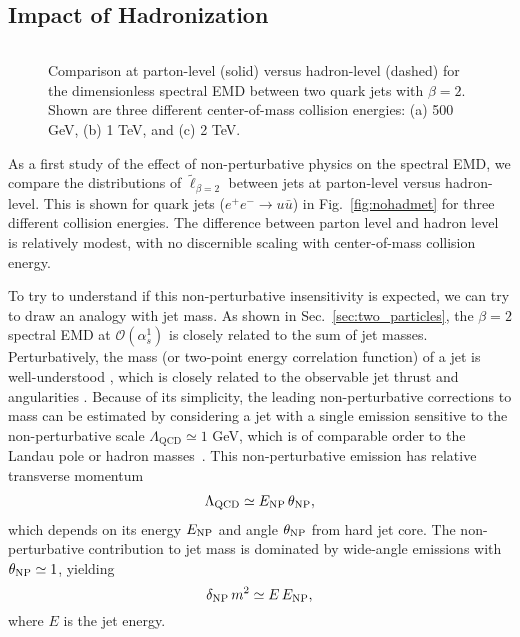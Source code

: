 \documentclass[letterpaper,11pt]{article}
\DeclareRobustCommand{\Sec}[1]{Sec.~\ref{#1}}
\DeclareRobustCommand{\Fig}[1]{Fig.~\ref{#1}}
\begin{document}
\subsection{Impact of Hadronization}

\begin{figure}[t]
\begin{center}
$\quad$
\\
\caption{
%
\label{fig:hadmet}
%
Comparison at parton-level (solid) versus hadron-level (dashed) for the dimensionless spectral EMD between two quark jets with $\beta = 2$.
%
Shown are three different center-of-mass collision energies: (a) 500 GeV, (b) 1 TeV, and (c) 2 TeV. 
}
\end{center}
\end{figure}

As a first study of the effect of non-perturbative physics on the spectral EMD, we compare the distributions of $\tilde \ell_{\beta = 2}$ between jets at parton-level versus hadron-level.
%
This is shown for quark jets ($e^+e^-\to u\bar u$) in \Fig{fig:nohadmet} for three different collision energies.
%
The difference between parton level and hadron level is relatively modest, with no discernible scaling with center-of-mass collision energy.


To try to understand if this non-perturbative insensitivity is expected, we can try to draw an analogy with jet mass.
%
As shown in \Sec{sec:two_particles}, the $\beta = 2$ spectral EMD at $\mathcal{O}(\alpha_s^1)$ is closely related to the sum of jet masses.
%
Perturbatively, the mass (or two-point energy correlation function) of a jet is well-understood \cite{Clavelli:1979md,Catani:1992ua,Banfi:2004yd}, which is closely related to the observable jet thrust and angularities \cite{Farhi:1977sg,Berger:2003iw,Ellis:2010rwa}.  
%
Because of its simplicity, the leading non-perturbative corrections to mass can be estimated by considering a jet with a single emission sensitive to the non-perturbative scale $\Lambda_\text{QCD} \simeq 1$ GeV, which is of comparable order to the Landau pole or hadron masses~\cite{Dokshitzer:1995zt}.
%
This non-perturbative emission has relative transverse momentum
%
\begin{align}
\Lambda_\text{QCD} \simeq E_{\rm NP} \, \theta_{\rm NP},
\end{align}
%
which depends on its energy $E_{\rm NP}$ and angle $ \theta_{\rm NP}$ from hard jet core.
%
The non-perturbative contribution to jet mass is dominated by wide-angle emissions with $\theta_{\rm NP} \simeq 1$, yielding
%
\begin{equation}
\delta_{\rm NP} \, m^2 \simeq E \, E_{\rm NP},
\end{equation}
%
where $E$ is the jet energy.
\end{document}
